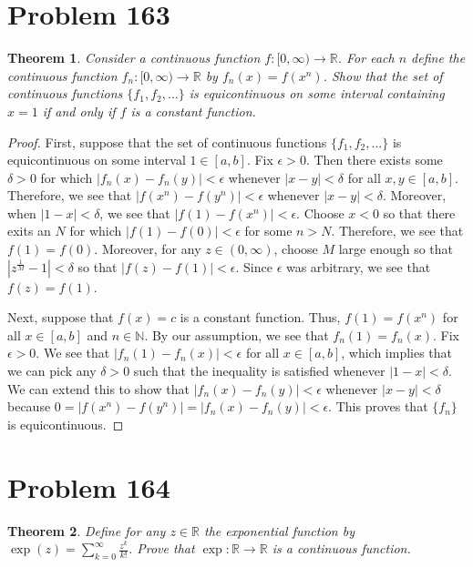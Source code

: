 \documentclass[psamsfonts]{amsart}
\newtheorem{thm}{Theorem}[section]
\theoremstyle{definition}
\theoremstyle{remark}
\numberwithin{equation}{section}
\begin{document}
\section{Problem 163}

\begin{thm}
Consider a continuous function $f: [0,\infty) \to \mathbb{R}$. For each $n$ define the continuous function $f_n : [0,\infty) \to \mathbb{R}$ by $f_n(x) = f(x^n)$. Show that the set of continuous functions $\{ f_1, f_2, \ldots \}$ is equicontinuous on some interval containing $x = 1$ if and only if $f$ is a constant function.
\end{thm}

\begin{proof}
First, suppose that the set of continuous functions $\{ f_1, f_2, \ldots \}$ is equicontinuous on some interval $1 \in [a,b]$. Fix $\epsilon > 0$. Then there exists some $\delta > 0$ for which $|f_n(x) - f_n(y) | < \epsilon$ whenever $|x-y| < \delta$ for all $x,y \in [a,b]$. Therefore, we see that $|f(x^n) - f(y^n) | < \epsilon$ whenever $|x - y| < \delta$. Moreover, when $|1 - x| < \delta$, we see that $|f(1) - f(x^n) | < \epsilon$. Choose $x < 0$ so that there exits an $N$ for which $|f(1) - f(0)| < \epsilon$ for some $n > N$. Therefore, we see that $f(1) = f(0)$. Moreover, for any $z \in (0,\infty)$, choose $M$ large enough so that $|z^{\frac{1}{M}} - 1| < \delta$ so that $|f(z) - f(1)| < \epsilon$. Since $\epsilon$ was arbitrary, we see that $f(z) = f(1)$. 

Next, suppose that $f(x) = c$ is a constant function. Thus, $f(1) = f(x^n)$ for all $x \in [a,b]$ and $n \in \mathbb{N}$. By our assumption, we see that $f_n(1) = f_n(x)$. Fix $\epsilon > 0$. We see that $|f_n(1) - f_n(x)| < \epsilon$ for all $x \in [a,b]$, which implies that we can pick any $\delta > 0$ such that the inequality is satisfied whenever $|1 - x| < \delta$. We can extend this to show that $|f_n(x) - f_n(y) | < \epsilon$ whenever $|x-y| < \delta$ because $0 = |f(x^n) - f(y^n)| = |f_n(x) - f_n(y)| < \epsilon$. This proves that $\{ f_n \}$ is equicontinuous. 
\end{proof}

\section{Problem 164}

\begin{thm}
Define for any $z \in \mathbb{R}$ the exponential function by $\exp(z) = \sum_{k=0}^\infty \frac{z^k}{k!}$. Prove that $\exp: \mathbb{R} \to \mathbb{R}$ is a continuous function.
\end{thm}
\end{document}
